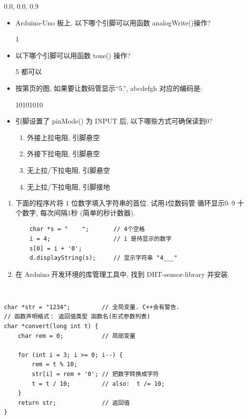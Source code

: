 \documentclass[a4paper,11pt]{seminar}
\begin{document}
\definecolor{magentacitecolor}{rgb} {0.0, 0.0, 0.9}
~\ \vskip-16mm ~
\begin{itemize}
    \item Arduino-Uno 板上, 以下哪个引脚可以用函数 analogWrite()操作?

       1\qquad{} \qquad{} \qquad{}
    \item 以下哪个引脚可以用函数 tone() 操作?

       5\qquad{} \qquad{} \qquad\qquad 都可以
   \item 按第\pageref{page:led8}页的图, 如果要让数码管显示``5.'', abcdefgh
       对应的编码是:

        10101010   
    \item 引脚设置了 pinMode() 为 INPUT 后, 以下哪些方式可确保读到0?
    \begin{enumerate}
        \item 外接上拉电阻, 引脚悬空
        \item 外接下拉电阻, 引脚悬空
        \item 无上拉/下拉电阻, 引脚悬空
        \item 无上拉/下拉电阻, 引脚接地
    \end{enumerate}

\end{itemize}
\endslide

\begin{enumerate}
    \item 下面的程序片将 1 位数字填入字符串的首位. 试用4位数码管
        循环显示0--9 十个数字, 每次间隔1秒 (简单的秒计数器).
\begin{lstlisting}
    char *s = "    ";       // 4个空格
    i = 4;                  // i 是待显示的数字
    s[0] = i + '0';
    d.displayString(s);     // 显示字符串 "4___"
\end{lstlisting}

    \item 在 Arduino 开发环境的库管理工具中, 找到 DHT-sensor-library 并安装.
\end{enumerate}
\endslide

~\ \vskip-6mm
\begin{lstlisting}
char *str = "1234";         // 全局变量. C++会有警告.
// 函数声明格式： 返回值类型 函数名(形式参数列表)
char *convert(long int t) {
    char rem = 0;           // 局部变量

    for (int i = 3; i >= 0; i--) {
        rem = t % 10;
        str[i] = rem + '0'; // 把数字转换成字符
        t = t / 10;         // also:  t /= 10;
    }
    return str;             // 返回值
}
\end{lstlisting}
\endslide
\end{document}
